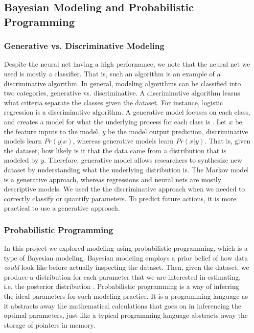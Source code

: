 \documentclass[]{article}
\begin{document}

\subsection{Bayesian Modeling and Probabilistic Programming}
\subsubsection{Generative vs. Discriminative Modeling}

Despite the neural net having a high performance, we note that the neural net we used is mostly a classifier. That is, such an algorithm is an example of a discriminative algorithm. In general, modeling algorithms can be classified into two categories, generative vs. discriminative. A discriminative algorithm learns what criteria separate the classes given the dataset.  For instance, logistic regression is a discriminative algorithm. A generative model focuses on each class, and creates a model for what the underlying process for each class is \cite{ng}. Let $x$ be the feature inputs to the model, $y$ be the model output prediction, discriminative models learn $Pr(y | x)$, whereas generative models learn $Pr(x | y)$. That is, given the dataset, how likely is it that the data came from a distribution that is modeled by $y$. Therefore, generative model allows researchers to synthesize new dataset by understanding what the underlying distribution is. The Markov model is a generative approach, whereas regressions and neural nets are mostly descriptive models. We used the the discriminative approach when we needed to correctly classify or quantify parameters. To predict future actions, it is more practical to use a generative approach.

\subsubsection{Probabilistic Programming}

In this project we explored modeling using probabilistic programming, which is a type of Bayesian modeling. Bayesian modeling employs a prior belief of how data \textit{could} look like before actually inspecting the dataset. Then, given the dataset, we produce a distribution for each parameter that we are interested in estimating, i.e. the posterior distribution \cite{ppblog}. Probabilistic programming is a way of inferring the ideal parameters for such modeling practice. It is a programming language as it abstracts away the mathematical calculations that goes on in inferencing the optimal parameters, just like a typical programming language abstracts away the storage of pointers in memory.
\end{document}
